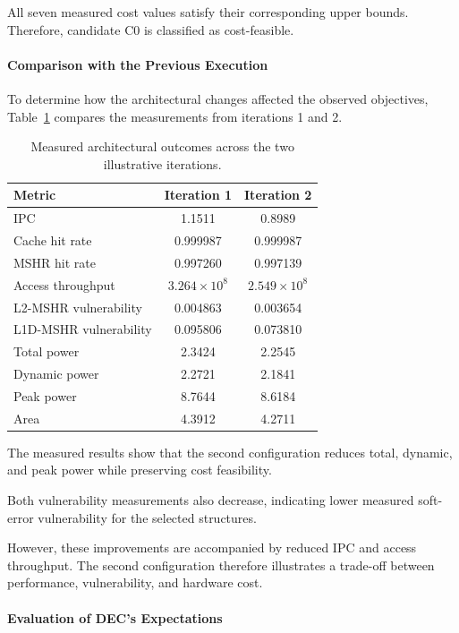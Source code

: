 All seven measured cost values satisfy
their corresponding upper bounds.
Therefore, candidate C0 is classified
as cost-feasible.

\paragraph{Comparison with the Previous Execution}

To determine how the architectural changes
affected the observed objectives,
Table~\ref{tab:illustrative_execution_comparison}
compares the measurements from iterations
1 and 2.

\begin{table}[htbp]
\centering
\caption{Measured architectural outcomes
across the two illustrative iterations.}
\label{tab:illustrative_execution_comparison}
\small
\renewcommand{\arraystretch}{1.1}
\begin{tabular}{lcc}
\hline
\textbf{Metric} &
\textbf{Iteration 1} &
\textbf{Iteration 2} \\
\hline
IPC & 1.1511 & 0.8989 \\
Cache hit rate & 0.999987 & 0.999987 \\
MSHR hit rate & 0.997260 & 0.997139 \\
Access throughput & $3.264\times10^8$ & $2.549\times10^8$ \\
L2-MSHR vulnerability & 0.004863 & 0.003654 \\
L1D-MSHR vulnerability & 0.095806 & 0.073810 \\
Total power & 2.3424 & 2.2545 \\
Dynamic power & 2.2721 & 2.1841 \\
Peak power & 8.7644 & 8.6184 \\
Area & 4.3912 & 4.2711 \\
\hline
\end{tabular}
\end{table}

The measured results show that the second
configuration reduces total, dynamic,
and peak power while preserving cost
feasibility.

Both vulnerability measurements also
decrease, indicating lower measured
soft-error vulnerability for the
selected structures.

However, these improvements are accompanied
by reduced IPC and access throughput.
The second configuration therefore
illustrates a trade-off between
performance, vulnerability, and
hardware cost.

\paragraph{Evaluation of DEC's Expectations}

